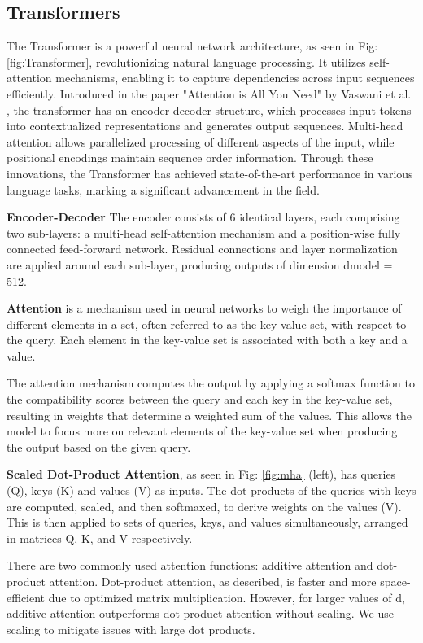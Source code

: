 \documentclass[UKenglish]{uiomasterthesis}
\begin{document}
\subsection{Transformers}
The Transformer is a powerful neural network architecture, as seen in Fig: \ref{fig:Transformer}, revolutionizing natural language processing. It utilizes self-attention mechanisms, enabling it to capture dependencies across input sequences efficiently. Introduced in the paper "Attention is All You Need" by Vaswani et al. \cite{vaswani_attention_2023}, the transformer has an encoder-decoder structure, which processes input tokens into contextualized representations and generates output sequences. Multi-head attention allows parallelized processing of different aspects of the input, while positional encodings maintain sequence order information. Through these innovations, the Transformer has achieved state-of-the-art performance in various language tasks, marking a significant advancement in the field.

\textbf{Encoder-Decoder} The encoder consists of 6 identical layers, each comprising two sub-layers: a multi-head self-attention mechanism and a position-wise fully connected feed-forward network. Residual connections and layer normalization are applied around each sub-layer, producing outputs of dimension dmodel = 512.


\textbf{Attention} is a mechanism used in neural networks to weigh the importance of different elements in a set, often referred to as the key-value set, with respect to the query. Each element in the key-value set is associated with both a key and a value.

The attention mechanism computes the output by applying a softmax function to the compatibility scores between the query and each key in the key-value set, resulting in weights that determine a weighted sum of the values. This allows the model to focus more on relevant elements of the key-value set when producing the output based on the given query. 

\textbf{Scaled Dot-Product Attention}, as seen in Fig: \ref{fig:mha} (left), has queries (Q), keys (K) and values (V) as inputs. The dot products of the queries with keys are computed, scaled, and then softmaxed, to derive weights on the values (V). This is then applied to sets of queries, keys, and values simultaneously, arranged in matrices Q, K, and V respectively. 

There are two commonly used attention functions: additive attention and dot-product attention. Dot-product attention, as described, is faster and more space-efficient due to optimized matrix multiplication. However, for larger values of d, additive attention outperforms dot product attention without scaling. We use scaling to mitigate issues with large dot products.
\end{document}
